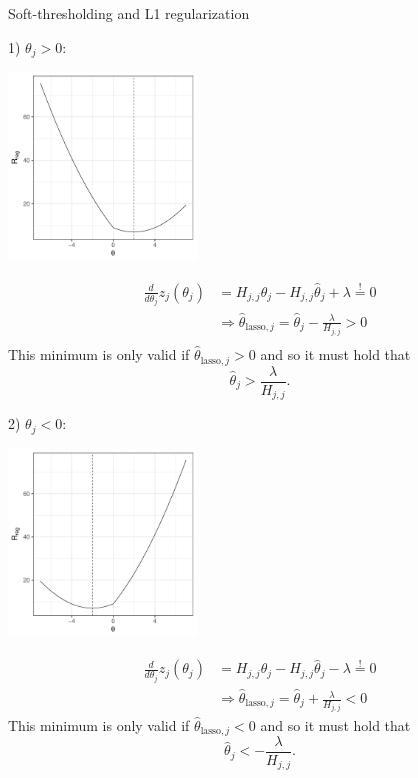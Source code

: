 \documentclass[11pt,compress,t,notes=noshow, xcolor=table]{beamer}
\begin{document}
\begin{vbframe}{Soft-thresholding and L1 regularization}
\framebreak

1) $\theta_j > 0:$ \\
\lz
\begin{minipage}{0.4\textwidth}
    \includegraphics[width=5cm]{figure/th_l1_pos.pdf}
\end{minipage}
\hfill
\begin{minipage}{0.49\textwidth}
\begin{align*}
    \frac{d}{d \theta_j}z_j(\theta_j) &= H_{j,j}\theta_j - H_{j,j} \hat{\theta}_j + \lambda \overset{!}{=} 0 \\
    &\Rightarrow  \hat{\theta}_{\text{lasso},j} = \hat{\theta}_j 
 -\frac{\lambda}{H_{j,j}} > 0 \\
 \end{align*}
 This minimum is only valid if $\hat{\theta}_{\text{lasso},j} > 0$ and so it must hold that
 \begin{equation*}
     \hat{\theta}_j >  \frac{\lambda}{H_{j,j}}.
 \end{equation*}
\end{minipage}
 \newpage

2) $\theta_j < 0:$ \\
\lz
\begin{minipage}{0.4\textwidth}
    \includegraphics[width=5cm]{figure/th_l1_neg.pdf}
\end{minipage}
\hfill
\begin{minipage}{0.49\textwidth}
\begin{align*}
    \frac{d}{d \theta_j}z_j(\theta_j) &= H_{j,j}\theta_j - H_{j,j} \hat{\theta}_j - \lambda \overset{!}{=} 0 \\
    &\Rightarrow  \hat{\theta}_{\text{lasso},j} = \hat{\theta}_j 
 +\frac{\lambda}{H_{j,j}} < 0
 \end{align*}
 This minimum is only valid if $\hat{\theta}_{\text{lasso},j} < 0$ and so it must hold that
 \begin{equation*}
     \hat{\theta}_j < -\frac{\lambda}{H_{j,j}}.
 \end{equation*}


\end{minipage}
\end{vbframe}
\end{document}
